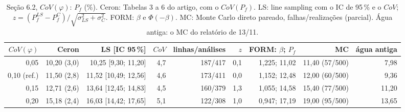 \begin{table}[htbp]\centering\scriptsize\setlength{\tabcolsep}{3pt}
\caption{Seção 6.2, $CoV(\varphi)$: $P_f$ (\%). Ceron: Tabelas 3 a 6 do artigo, com o $CoV(P_f)$. LS: line sampling com o IC de 95\,\% e o $CoV$; $z = (P_f^{LS} - P_f^{C})/\sqrt{\sigma_{LS}^2 + \sigma_C^2}$. FORM: $\beta$ e $\Phi(-\beta)$. MC: Monte Carlo direto pareado, falhas/realizações (parcial). Água antiga: o MC do relatório de 13/11.}\label{tab:pf_covphi}
\begin{tabular}{rrrrrrrrr}\toprule
$CoV(\varphi)$ & Ceron & LS [IC 95\,\%] & $CoV$ & linhas/análises & $z$ & FORM: $\beta$; $P_f$ & MC & água antiga \\\midrule
0{,}05 & 10{,}20 (3{,}0) & 10{,}25 [9{,}30; 11{,}20] & 4{,}7 & 187/417 & 0{,}1 & 1{,}225; 11{,}02 & 11{,}40 (57/500) & 7{,}98 \\
0{,}10 (ref.) & 11{,}50 (2{,}8) & 11{,}52 [10{,}49; 12{,}56] & 4{,}6 & 173/411 & 0{,}0 & 1{,}152; 12{,}48 & 12{,}00 (60/500) & 9{,}36 \\
0{,}15 & 12{,}71 (2{,}6) & 13{,}64 [12{,}45; 14{,}83] & 4{,}5 & 160/379 & 1{,}3 & 1{,}055; 14{,}58 & 15{,}40 (77/500) & 11{,}20 \\
0{,}20 & 15{,}18 (2{,}4) & 16{,}03 [14{,}42; 17{,}65] & 5{,}1 & 122/308 & 1{,}0 & 0{,}947; 17{,}19 & 19{,}00 (95/500) & 13{,}65 \\
\bottomrule\end{tabular}\end{table}
